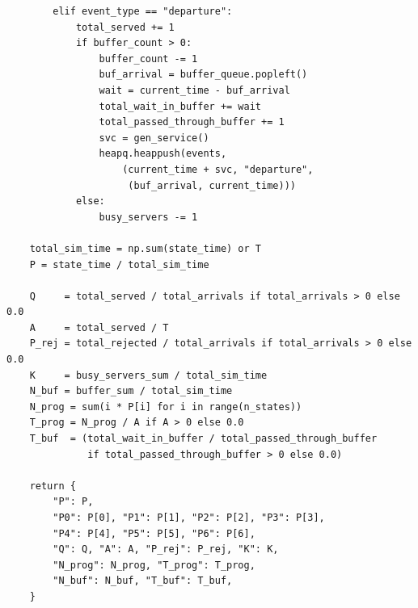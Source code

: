 \documentclass[14pt,a4paper]{extarticle}
\begin{document}
\begin{verbatim}
        elif event_type == "departure":
            total_served += 1
            if buffer_count > 0:
                buffer_count -= 1
                buf_arrival = buffer_queue.popleft()
                wait = current_time - buf_arrival
                total_wait_in_buffer += wait
                total_passed_through_buffer += 1
                svc = gen_service()
                heapq.heappush(events,
                    (current_time + svc, "departure",
                     (buf_arrival, current_time)))
            else:
                busy_servers -= 1

    total_sim_time = np.sum(state_time) or T
    P = state_time / total_sim_time

    Q     = total_served / total_arrivals if total_arrivals > 0 else 0.0
    A     = total_served / T
    P_rej = total_rejected / total_arrivals if total_arrivals > 0 else 0.0
    K     = busy_servers_sum / total_sim_time
    N_buf = buffer_sum / total_sim_time
    N_prog = sum(i * P[i] for i in range(n_states))
    T_prog = N_prog / A if A > 0 else 0.0
    T_buf  = (total_wait_in_buffer / total_passed_through_buffer
              if total_passed_through_buffer > 0 else 0.0)

    return {
        "P": P,
        "P0": P[0], "P1": P[1], "P2": P[2], "P3": P[3],
        "P4": P[4], "P5": P[5], "P6": P[6],
        "Q": Q, "A": A, "P_rej": P_rej, "K": K,
        "N_prog": N_prog, "T_prog": T_prog,
        "N_buf": N_buf, "T_buf": T_buf,
    }
\end{verbatim}
\end{document}
